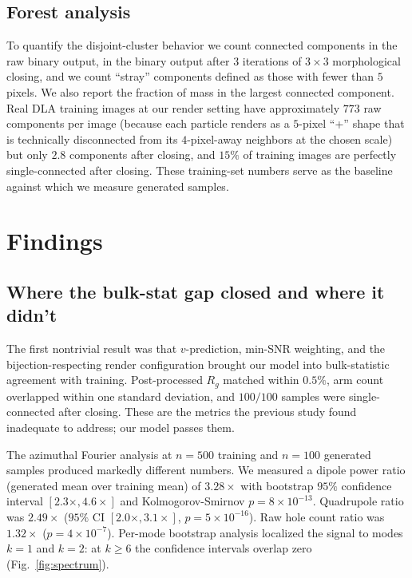 \documentclass[11pt]{article}
\begin{document}
\subsection{Forest analysis}

To quantify the disjoint-cluster behavior we count connected components in the raw binary output, in the binary output after $3$ iterations of $3 \times 3$ morphological closing, and we count ``stray'' components defined as those with fewer than $5$ pixels. We also report the fraction of mass in the largest connected component. Real DLA training images at our render setting have approximately $773$ raw components per image (because each particle renders as a $5$-pixel ``+'' shape that is technically disconnected from its $4$-pixel-away neighbors at the chosen scale) but only $2.8$ components after closing, and $15\%$ of training images are perfectly single-connected after closing. These training-set numbers serve as the baseline against which we measure generated samples.

\section{Findings}

\subsection{Where the bulk-stat gap closed and where it didn't}

The first nontrivial result was that $v$-prediction, min-SNR weighting, and the bijection-respecting render configuration brought our model into bulk-statistic agreement with training. Post-processed $R_g$ matched within $0.5\%$, arm count overlapped within one standard deviation, and $100/100$ samples were single-connected after closing. These are the metrics the previous study found inadequate to address; our model passes them.

The azimuthal Fourier analysis at $n = 500$ training and $n = 100$ generated samples produced markedly different numbers. We measured a dipole power ratio (generated mean over training mean) of $3.28\times$ with bootstrap $95\%$ confidence interval $[2.3\times, 4.6\times]$ and Kolmogorov-Smirnov $p = 8 \times 10^{-13}$. Quadrupole ratio was $2.49\times$ ($95\%$ CI $[2.0\times, 3.1\times]$, $p = 5 \times 10^{-16}$). Raw hole count ratio was $1.32\times$ ($p = 4 \times 10^{-7}$). Per-mode bootstrap analysis localized the signal to modes $k = 1$ and $k = 2$: at $k \geq 6$ the confidence intervals overlap zero (Fig.~\ref{fig:spectrum}).
\end{document}
